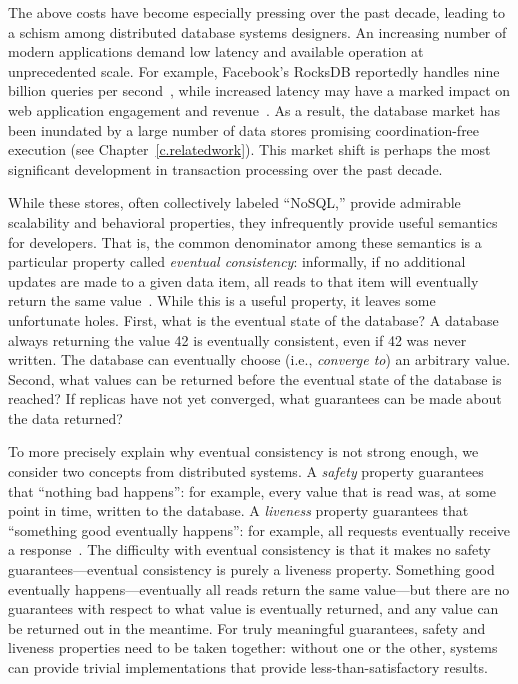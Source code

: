 The above costs have become especially pressing over the past decade,
leading to a schism among distributed database systems designers. An
increasing number of modern applications demand low latency and
available operation at unprecedented scale. For example, Facebook's
RocksDB reportedly handles nine billion queries per
second~\cite{rocks-tweet}, while increased latency may have a marked
impact on web application engagement and
revenue~\cite{google-talk,amazon-latency,perf-impact}. As a result,
the database market has been inundated by a large number of data stores
promising coordination-free execution (see
Chapter~\ref{c.relatedwork}). This market shift is perhaps the most
significant development in transaction processing over the past
decade.

While these stores, often collectively labeled ``NoSQL,'' provide
admirable scalability and behavioral properties, they infrequently
provide useful semantics for developers. That is, the common
denominator among these semantics is a particular property called
\textit{eventual consistency}: informally, if no additional updates
are made to a given data item, all reads to that item will eventually
return the same value~\cite{vogels-defs}. While this is a useful
property, it leaves some unfortunate holes. First, what is the
eventual state of the database? A database always returning the value
42 is eventually consistent, even if 42 was never written. The
database can eventually choose (i.e., \textit{converge to}) an
arbitrary value. Second, what values can be returned before the
eventual state of the database is reached? If replicas have not yet
converged, what guarantees can be made about the data returned?

To more precisely explain why eventual consistency is not strong
enough, we consider two concepts from distributed systems. A
\textit{safety} property guarantees that ``nothing bad happens'': for
example, every value that is read was, at some point in time, written
to the database. A \textit{liveness} property guarantees that
``something good eventually happens'': for example, all requests
eventually receive a response~\cite{liveness}. The difficulty with
eventual consistency is that it makes no safety guarantees---eventual
consistency is purely a liveness property. Something good eventually
happens---eventually all reads return the same value---but there are
no guarantees with respect to what value is eventually returned, and
any value can be returned out in the meantime. For truly meaningful
guarantees, safety and liveness properties need to be taken together:
without one or the other, systems can provide trivial implementations
that provide less-than-satisfactory results.

